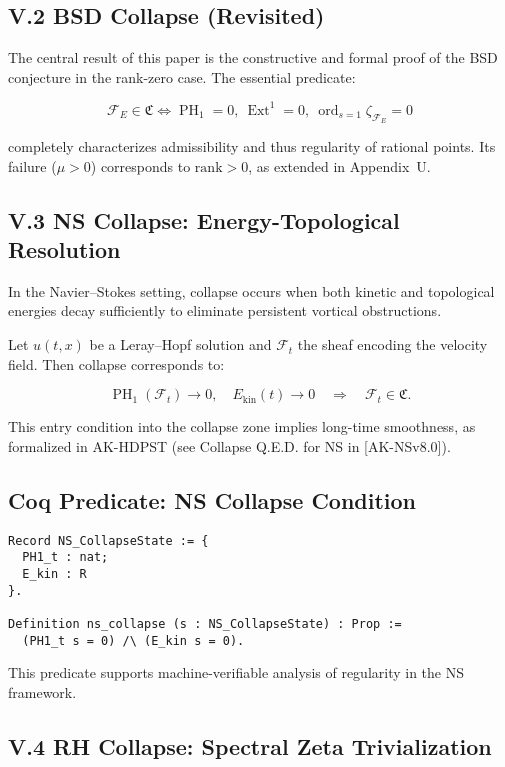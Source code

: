 \documentclass[11pt]{article}
\DeclareMathOperator{\Ext}{Ext}
\DeclareMathOperator{\PH}{PH}
\newcommand{\ord}{\operatorname{ord}}
\begin{document}
\subsection*{V.2 BSD Collapse (Revisited)}

The central result of this paper is the constructive and formal proof of the BSD conjecture in the rank-zero case. The essential predicate:

\[
\mathcal{F}_E \in \mathfrak{C} \iff \PH_1 = 0,~ \Ext^1 = 0,~ \ord_{s=1} \zeta_{\mathcal{F}_E} = 0
\]

completely characterizes admissibility and thus regularity of rational points. Its failure (\( \mu > 0 \)) corresponds to \( \mathrm{rank} > 0 \), as extended in Appendix~U.

\subsection*{V.3 NS Collapse: Energy-Topological Resolution}

In the Navier–Stokes setting, collapse occurs when both kinetic and topological energies decay sufficiently to eliminate persistent vortical obstructions.

Let \( u(t,x) \) be a Leray–Hopf solution and \( \mathcal{F}_t \) the sheaf encoding the velocity field. Then collapse corresponds to:

\[
\PH_1(\mathcal{F}_t) \to 0, \quad E_{\mathrm{kin}}(t) \to 0 \quad \Rightarrow \quad \mathcal{F}_t \in \mathfrak{C}.
\]

This entry condition into the collapse zone implies long-time smoothness, as formalized in AK-HDPST (see Collapse Q.E.D. for NS in [AK-NSv8.0]).

\subsection*{Coq Predicate: NS Collapse Condition}
\begin{lstlisting}[language=Coq]
Record NS_CollapseState := {
  PH1_t : nat;
  E_kin : R
}.

Definition ns_collapse (s : NS_CollapseState) : Prop :=
  (PH1_t s = 0) /\ (E_kin s = 0).
\end{lstlisting}

This predicate supports machine-verifiable analysis of regularity in the NS framework.

\subsection*{V.4 RH Collapse: Spectral Zeta Trivialization}
\end{document}
